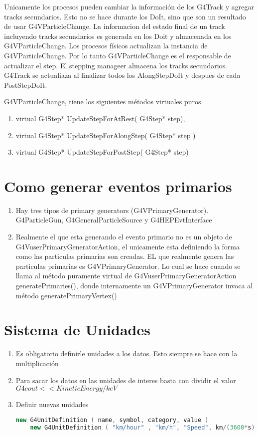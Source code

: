 \documentclass[10pt,a4paper,oneside]{book}
\begin{document}
Unicamente los procesos pueden cambiar la información de los G4Track y
agregar tracks secundarios. Esto no se hace durante los DoIt, sino que
son un resultado de usar G4VParticleChange. La informacion del estado
final de un track incluyendo tracks secundarios es generada en los
Doit y almacenada en los G4VParticleChange. Los procesos físicos
actualizan la instancia de G4VParticleChange. Por lo tanto
G4VParticleChange es el responsable de actualizar el step. El stepping
manageer almacena los tracks secundarios.  G4Track se actualiaza al
finalizar todos los AlongStepDoIt y despues de cada PostStepDoIt.

G4VParticleChange, tiene los siguientes métodos virtuales puros.
\begin{enumerate}
\item virtual G4Step* UpdateStepForAtRest( G4Step* step),
\item virtual G4Step* UpdateStepForAlongStep( G4Step* step )
\item virtual G4Step* UpdateStepForPostStep( G4Step* step)
\end{enumerate}



\section*{Como generar eventos primarios}
\begin{enumerate}
\item Hay tres tipos de primary generators
  (G4VPrimaryGenerator). G4ParticleGun, G4GeneralParticleSource y G4HEPEvtInterface
\item Realmente el que esta generando el evento primario no es un
  objeto de G4VuserPrimaryGeneratorAction, el unicamente esta
  definiendo la forma como las particulas primarias son creadas. EL
  que realmente genera las particulas primarias es
  G4VPrimaryGenerator. Lo cual se hace cuando se llama al método
  puramente virtual de G4VuserPrimaryGeneratorAction
  generatePrimaries(), donde internamente un G4VPrimaryGenerator
  invoca al método generatePrimaryVertex()
\end{enumerate}

\section*{Sistema de Unidades}
\begin{enumerate}
\item Es obligatorio definirle unidades a los datos. Esto siempre se
  hace con la multiplicación 
\item Para sacar los datos en las unidades de interes basta con
  dividir el valor  $G4cout << KineticEnergy/keV $
\item Definir nuevas unidades
  \begin{lstlisting}[language=C++, frame = single]
    new G4UnitDefinition ( name, symbol, category, value )
    new G4UnitDefinition ( "km/hour" , "km/h", "Speed", km/(3600*s) );
  \end{lstlisting}
\end{enumerate}
\end{document}
